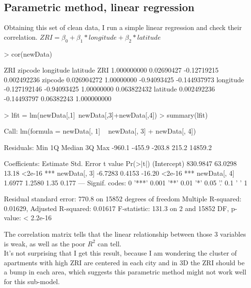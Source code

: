 \documentclass[a4paper]{article}
\begin{document}
\subsection{Parametric method, linear regression}
Obtaining this set of clean data, I run a simple linear regression and check their correlation. $ZRI = \beta_{0} + \beta_{1}*longitude + \beta_{2}* latitude$\\
\begin{Schunk}
\begin{Sinput}
> cor(newData)
\end{Sinput}
\begin{Soutput}
                   ZRI     zipcode   longitude     latitude
ZRI        1.000000000  0.02690427 -0.12719215  0.002492236
zipcode    0.026904272  1.00000000 -0.94093425 -0.144937973
longitude -0.127192146 -0.94093425  1.00000000  0.063822432
latitude   0.002492236 -0.14493797  0.06382243  1.000000000
\end{Soutput}
\begin{Sinput}
> lfit = lm(newData[,1]~newData[,3]+newData[,4])
> summary(lfit)
\end{Sinput}
\begin{Soutput}
Call:
lm(formula = newData[, 1] ~ newData[, 3] + newData[, 4])

Residuals:
    Min      1Q  Median      3Q     Max 
 -960.1  -455.9  -203.8   215.2 14859.2 

Coefficients:
             Estimate Std. Error t value Pr(>|t|)    
(Intercept)  830.9847    63.0298   13.18   <2e-16 ***
newData[, 3]  -6.7283     0.4153  -16.20   <2e-16 ***
newData[, 4]   1.6977     1.2580    1.35    0.177    
---
Signif. codes:  0 '***' 0.001 '**' 0.01 '*' 0.05 '.' 0.1 ' ' 1

Residual standard error: 770.8 on 15852 degrees of freedom
Multiple R-squared:  0.01629,	Adjusted R-squared:  0.01617 
F-statistic: 131.3 on 2 and 15852 DF,  p-value: < 2.2e-16
\end{Soutput}
\end{Schunk}
The correlation matrix tells that the linear relationship between those 3 variables is weak, as well as the poor $R^2$ can tell.\\
It's not surprising that I get this result, because I am wondering the cluster of apartments with high ZRI are centered in each city and in 3D the ZRI should be a bump in each area, which suggests this parametric method might not work well for this sub-model.
\end{document}
